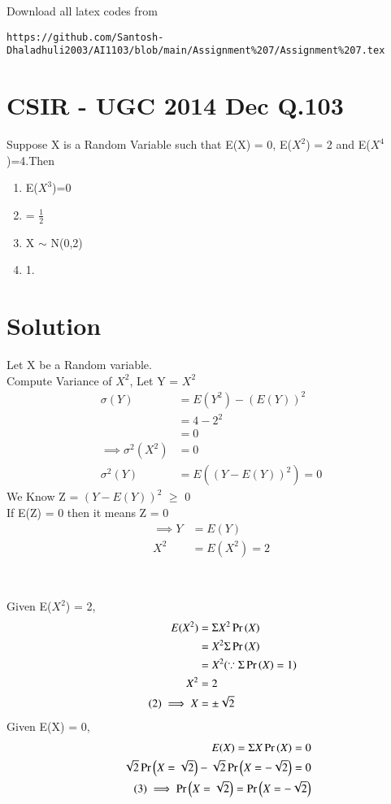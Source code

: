 \documentclass[journal,12pt,twocolumn]{IEEEtran}
\begin{document}
Download all latex codes from 
\begin{lstlisting}
https://github.com/Santosh-Dhaladhuli2003/AI1103/blob/main/Assignment%207/Assignment%207.tex
\end{lstlisting}
\section{\textbf{CSIR - UGC 2014 Dec Q.103}}
Suppose X is a Random Variable such that E(X) = 0, E($X^2$) = 2 and E($X^4$)=4.Then

\begin{enumerate}
\item  E($X^3$)=0
\item {}= $\frac{1}{2}$
\item X $\sim$ N(0,2) 
\item {} 1.
\end{enumerate}

\section{\textbf{Solution}}
Let X be a Random variable. \\
Compute Variance of $X^2$, Let Y = $X^2$
\begin{align*}
    \sigma(Y) &= E(Y^2) - (E(Y))^{2} \\
             &=  4 - 2^2 \\
             &= 0\\
\tag{1}   \implies \sigma^2(X^2) &= 0 \\
\sigma^2(Y) &= E((Y - E(Y))^2) = 0
\end{align*}
We Know Z = $(Y - E(Y))^2$ $\ge$ 0 \\
If E(Z) = 0 then it means Z = 0 
\begin{align*}
  \implies Y &= E(Y) \\
  \tag{*}
  X^2 &= E(X^2) = 2
\end{align*}
\begin{center}

     \\
\end{center}
Given E($X^2$) = 2,
\begin{align*}
    E(X^2) &= \Sigma X^2\Pr\left(X\right) \\
           &= X^2\Sigma \Pr\left(X\right)  \\
           &= X^2 (\because \Sigma \Pr\left(X\right) = 1) \\
       X^2 &= 2 \\
\tag{2} \label{X}
\implies X &= \pm \sqrt{2}
\end{align*}
Given E(X) = 0,
\begin{align*}
                      E(X) = \Sigma X\Pr\left(X\right) = 0 \\
                    \sqrt{2}\Pr\left(X = \sqrt{2}\right)-\sqrt{2}\Pr\left(X = -\sqrt{2}\right) = 0\\
      \tag{3} \label{P(X)}
\implies \Pr\left(X = \sqrt{2}\right) = \Pr\left(X = -\sqrt{2}\right)
\end{align*}
\end{document}
